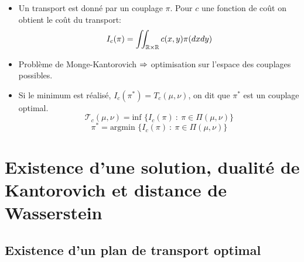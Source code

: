 \documentclass{beamer}
\theoremstyle{definition}
\begin{document}
\begin{frame}
		\begin{itemize}
				\item Un transport est donné par un couplage $\pi$. Pour $c$ une fonction de coût on obtient le coût du transport:
				$$I_c (\pi) = \iint_{\mathbb{R}\times\mathbb{R} }
				c(x, y) \pi(dxdy)$$
				\item Problème de Monge-Kantorovich $\Large\Rightarrow$ optimisation sur l'espace des couplages possibles. 
				\item Si le minimum est réalisé, $I_c (\pi^*) = T_c (\mu, \nu)$, on dit que $\pi^*$ est un couplage optimal.
				 $$\mathcal T_c (\mu, \nu) = \text{inf }\big\{I_c (\pi) \ : \ \pi \in \Pi(\mu, \nu) \big\}$$
				  $$\pi^* = \text{argmin }\big\{I_c (\pi) \ : \ \pi \in \Pi(\mu, \nu) \big\}$$
			\end{itemize}

\end{frame}

\section{Existence d'une solution, dualité de Kantorovich et distance de Wasserstein}
\subsection{Existence d'un plan de transport optimal}
\end{document}
